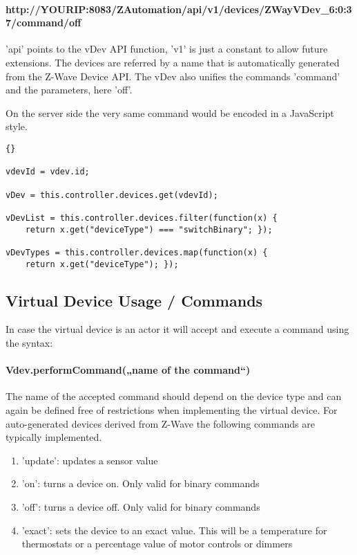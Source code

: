 \paragraph{http://YOURIP:8083/ZAutomation/api/v1/devices/ZWayVDev\_6:0:37/command/off}

'api' points to the vDev API function, 'v1' is just a constant to allow future extensions. 
The devices are referred by a name that is automatically generated from the Z-Wave 
Device API. The vDev also unifies the commands 'command' and the parameters, here 'off'.

On the server side the very same command would be encoded in a JavaScript style.

\begin{lstlisting}[caption=Access vDevs]{}

vdevId = vdev.id;

vDev = this.controller.devices.get(vdevId);

vDevList = this.controller.devices.filter(function(x) { 
	return x.get("deviceType") === "switchBinary"; }); 

vDevTypes = this.controller.devices.map(function(x) { 
	return x.get("deviceType"); }); 
\end{lstlisting}

\subsection{Virtual Device Usage / Commands}

In case the virtual device is an actor it will accept and execute a command using the 
syntax:

\paragraph{Vdev.performCommand(„name of the command“)}

The name of the accepted command should depend on the device type and can again be defined 
free of restrictions when implementing the virtual device. For auto-generated devices 
derived from Z-Wave the following commands are typically implemented.

\begin{enumerate}
\item 'update': updates a sensor value
\item 'on': turns a device on.  Only valid for binary commands
\item 'off': turns a device off. Only valid for binary commands
\item 'exact': sets the device to an exact value. This will be a temperature for 
thermostats or a percentage value of motor controls or dimmers
\end{enumerate}

